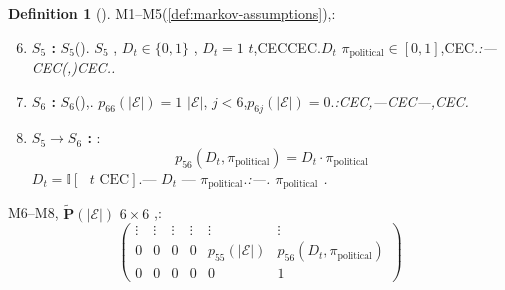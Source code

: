\documentclass[12pt,a4paper]{article}
\theoremstyle{definition}
\newtheorem{definition}{Definition}[section]
\theoremstyle{remark}
\begin{document}
\begin{definition}[]
\label{def:markov-assumptions-extended}
M1--M5(\ref{def:markov-assumptions}),:

\begin{enumerate}[label=\textbf{M\arabic*}, leftmargin=*, itemsep=4pt]
\setcounter{enumi}{5}
\item \textbf{$S_5$ :} $S_5$(). $S_5$ , $D_t \in \{0, 1\}$ , $D_t = 1$  $t$,CECCEC.$D_t$  $\pi_{\text{political}} \in [0, 1]$,CEC.\hfill\textit{:---CEC(,)CEC..}

\item \textbf{$S_6$ :}  $S_6$(),. $p_{66}(|\mathcal{E}|) = 1$  $|\mathcal{E}|$, $j < 6$,$p_{6j}(|\mathcal{E}|) = 0$.\hfill\textit{:CEC,---CEC---,CEC.}

\item \textbf{$S_5 \to S_6$ :} :
\begin{equation}
p_{56}(D_t, \pi_{\text{political}}) = D_t \cdot \pi_{\text{political}}
\end{equation}
 $D_t = \mathbb{I}[\text{ }t\text{ CEC}]$.--- $D_t$ --- $\pi_{\text{political}}$.\hfill\textit{:---. $\pi_{\text{political}}$ .}
\end{enumerate}
\end{definition}

M6--M8, $\tilde{\mathbf{P}}(|\mathcal{E}|)$  $6 \times 6$ ,:
\begin{equation}
\begin{pmatrix}
\vdots & \vdots & \vdots & \vdots & \vdots & \vdots \\
0 & 0 & 0 & 0 & p_{55}(|\mathcal{E}|) & p_{56}(D_t, \pi_{\text{political}}) \\
0 & 0 & 0 & 0 & 0 & 1
\end{pmatrix}
\end{equation}
\end{document}
